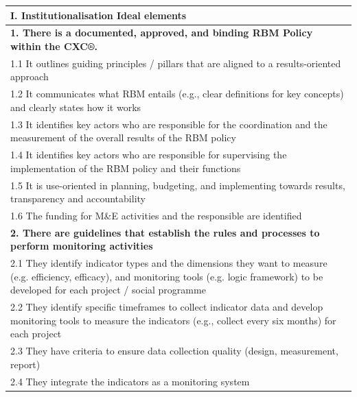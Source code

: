 \documentclass[
  10pt,
]{book}
\begin{document}
\begin{table}
\centering
\begin{tabular}[t]{l}
\hline
I. Institutionalisation Ideal elements\\
\hline
\multicolumn{1}{l}{\textbf{1. There is a documented, approved, and binding RBM Policy within the CXC®.}}\\
\hline
\hspace{1em}1.1 It outlines guiding principles / pillars that are aligned to a results-oriented approach\\
\hline
\hspace{1em}1.2 It communicates what RBM entails (e.g., clear definitions for key concepts) and clearly states how it works\\
\hline
\hspace{1em}1.3 It identifies key actors who are responsible for the coordination and the measurement of the overall results of the RBM policy\\
\hline
\hspace{1em}1.4 It identifies key actors who are responsible for supervising the implementation of the RBM policy and their functions\\
\hline
\hspace{1em}1.5 It is use-oriented in planning, budgeting, and implementing towards results, transparency and accountability\\
\hline
\hspace{1em}1.6 The funding for M\&E activities and the responsible are identified\\
\hline
\multicolumn{1}{l}{\textbf{2. There are guidelines that establish the rules and processes to perform monitoring activities}}\\
\hline
\hspace{1em}2.1 They identify indicator types and the dimensions they want to measure (e.g. efficiency, efficacy), and monitoring tools (e.g. logic framework) to be developed for each project / social programme\\
\hline
\hspace{1em}2.2 They identify specific timeframes to collect indicator data and develop monitoring tools to measure the indicators (e.g., collect every six months) for each project\\
\hline
\hspace{1em}2.3 They have criteria to ensure data collection quality (design, measurement, report)\\
\hline
\hspace{1em}2.4 They integrate the indicators as a monitoring system\\

\end{tabular}
\end{table}
\end{document}
